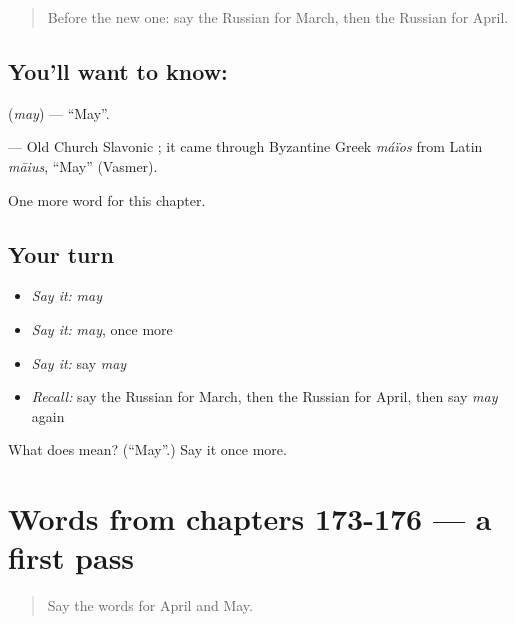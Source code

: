 \begin{quote}
Before the new one: say the Russian for March, then the Russian for April.
\end{quote}

\subsection*{You'll want to know: }
\textbf{} (\emph{may}) — \textquotedblleft{}May\textquotedblright{}.

\begin{cousinweb}
\textbf{} — Old Church Slavonic \emph{}; it came through Byzantine Greek \emph{máïos} from Latin \emph{māius}, \textquotedblleft{}May\textquotedblright{} (Vasmer).
\end{cousinweb}

\begin{grammarlens}[title={What you've built}]
One more word for this chapter.
\end{grammarlens}

\subsection*{Your turn}
\begin{itemize}
\raggedright
  \item \emph{Say it:} \emph{may}
  \item \emph{Say it:} \emph{may}, once more
  \item \emph{Say it:} say \emph{may}
  \item \emph{Recall:} say the Russian for March, then the Russian for April, then say \emph{may} again
\end{itemize}

\begin{tcolorbox}[breakable,colback=teal!4,colframe=teal!35!black,title={Before you move on}]
What does  mean? (\textquotedblleft{}May\textquotedblright{}.) Say it once more.
\end{tcolorbox}
\section[(dialogue)]{Words from chapters 173-176 — a first pass}

\label{lesson:RU-R181-first-pass-words-from-chapters-173-176}



\begin{quote}
Say the words for April and May.
\end{quote}

